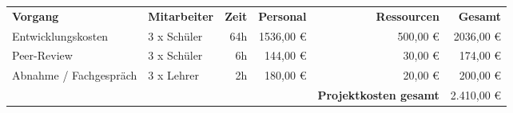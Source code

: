 \begin{tabular}{llrrrr}
    \rowcolor{heading}\textbf{Vorgang} & \textbf{Mitarbeiter} & \textbf{Zeit} & \textbf{Personal} & \textbf{Ressourcen} & \textbf{Gesamt} \\
    Entwicklungskosten & 3 x Schüler & 64h & 1536,00 € & 500,00 € & 2036,00 € \\
    \rowcolor{odd}Peer-Review & 3 x Schüler & 6h & 144,00 € & 30,00 € & 174,00 € \\
    Abnahme / Fachgespräch & 3 x Lehrer & 2h & 180,00 € & 20,00 € & 200,00 € \\
    \hline
    \hline
    \rowcolor{odd} & & & & \textbf{Projektkosten gesamt} & 2.410,00 € \\
\end{tabular}